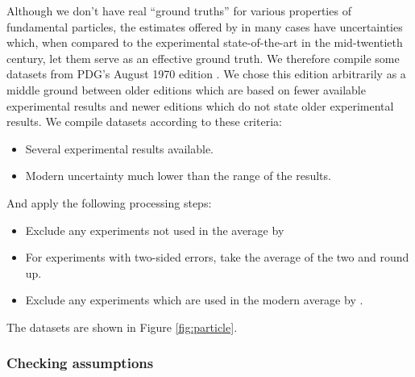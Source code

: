 \documentclass[12pt]{article}
\begin{document}
Although we don't have real ``ground truths'' for various properties of fundamental particles, the estimates offered by \citet{navas2024review} in many cases have uncertainties which, when compared to the experimental state-of-the-art in the mid-twentieth century, let them serve as an effective ground truth. We therefore compile some datasets from PDG's August 1970 edition \citet{roos1970review}. We chose this edition arbitrarily as a middle ground between older editions which are based on fewer available experimental results and newer editions which do not state older experimental results. We compile datasets according to these criteria:
\begin{itemize}
  \item Several experimental results available.
  \item Modern uncertainty much lower than the range of the results.
\end{itemize}
And apply the following processing steps:
\begin{itemize}
  \item Exclude any experiments not used in the average by \citet{roos1970review}
  \item For experiments with two-sided errors, take the average of the two and round up.
  \item Exclude any experiments which are used in the modern average by \citet{navas2024review}.
\end{itemize}
The datasets are shown in Figure \ref{fig:particle}.

\subsubsection{Checking assumptions}
\end{document}
